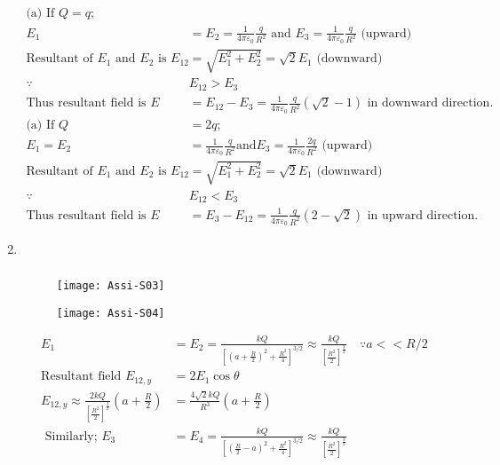 \begin{enumerate}
\begin{answer}
\begin{align*}
	\text{(a) If }Q=q;\\
	E_{1}&=E_{2}=\frac{1}{4 \pi \varepsilon_{0}} \frac{q}{R^{2}}\text{ and }E_{3}=\frac{1}{4 \pi \varepsilon_{0}} \frac{q}{R^{2}}\text{ (upward)}\\
	\text{Resultant of $E_{1}$ and $E_{2}$ is }E_{12}&=\sqrt{E_{1}^{2}+E_{2}^{2}}=\sqrt{2} E_{1}\text{ (downward)}\\
	\because &E_{12}>E_{3}\\
	\text{Thus resultant field is }E&=E_{12}-E_{3}=\frac{1}{4 \pi \varepsilon_{0}} \frac{q}{R^{2}}(\sqrt{2}-1)\text{ in downward direction.}\\
	\text{(a) If }Q&=2 q;\\
	E_{1}=E_{2}&=\frac{1}{4 \pi \varepsilon_{0}} \frac{q}{R^{2}}\text{and}
	E_{3}=\frac{1}{4 \pi \varepsilon_{0}} \frac{2 q}{R^{2}}\text{ (upward)}\\
	\text{Resultant of $E_{1}$ and $E_{2}$ is }E_{12}&=\sqrt{E_{1}^{2}+E_{2}^{2}}=\sqrt{2} E_{1}\text{ (downward)}\\
	\because &E_{12}<E_{3}\\
	\text{Thus resultant field is }E&=E_{3}-E_{12}=\frac{1}{4 \pi \varepsilon_{0}} \frac{q}{R^{2}}(2-\sqrt{2})\text{ in upward direction.}
	\end{align*}
\end{answer}
\item $\left. \right. $
\begin{answer}$\left. \right. $
		\begin{figure}[H]
		\centering
		\texttt{[image: Assi-S03]}
	\end{figure}
	\begin{figure}[H]
	\centering
	\texttt{[image: Assi-S04]}
\end{figure}
	\begin{align*}
	E_{1}&=E_{2}=\frac{k Q}{\left[\left(a+\frac{R}{2}\right)^{2}+\frac{R^{2}}{4}\right]^{3 / 2}} \approx \frac{k Q}{\left[\frac{R^{2}}{2}\right]^{\frac{3}{2}}} \quad \because a<<R / 2\\ \text{Resultant field }E_{12, y}&=2 E_{1} \cos \theta\\
	E_{12, y} \approx \frac{2 k Q}{\left[\frac{R^{2}}{2}\right]^{\frac{3}{2}}}\left(a+\frac{R}{2}\right)&=\frac{4 \sqrt{2} k Q}{R^{3}}\left(a+\frac{R}{2}\right) \\
	\text { Similarly; } E_{3}&=E_{4}=\frac{k Q}{\left[\left(\frac{R}{2}-a\right)^{2}+\frac{R^{2}}{4}\right]^{3 / 2}} \approx \frac{k Q}{\left[\frac{R^{2}}{2}\right]^{\frac{3}{2}}} \\

\end{align*}
\end{answer}
\end{enumerate}
